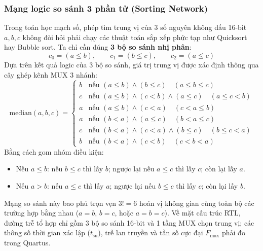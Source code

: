 \subsubsection*{Mạng logic so sánh 3 phần tử (Sorting Network)}
Trong toán học mạch số, phép tìm trung vị của 3 số nguyên không dấu 16-bit $a, b, c$ không đòi hỏi phải chạy các thuật toán sắp xếp phức tạp như Quicksort hay Bubble sort. Ta chỉ cần đúng \textbf{3 bộ so sánh nhị phân}:
\begin{equation}
    c_0 = (a \le b), \qquad c_1 = (b \le c), \qquad c_2 = (a \le c)
\end{equation}
Dựa trên kết quả logic của 3 bộ so sánh, giá trị trung vị được xác định thông qua cây ghép kênh MUX 3 nhánh:
\begin{equation}
    \text{median}(a, b, c) =
    \begin{cases}
        b & \text{nếu } (a \le b) \land (b \le c) \quad (a \le b \le c) \\
        c & \text{nếu } (a \le b) \land (c < b) \land (a \le c) \quad (a \le c < b) \\
        a & \text{nếu } (a \le b) \land (c < a) \quad (c < a \le b) \\
        a & \text{nếu } (b < a) \land (a \le c) \quad (b < a \le c) \\
        c & \text{nếu } (b < a) \land (c < a) \land (b \le c) \quad (b \le c < a) \\
        b & \text{nếu } (b < a) \land (c < b) \quad (c < b < a)
    \end{cases}
    \label{eq:median3_cases}
\end{equation}
Bằng cách gom nhóm điều kiện:
\begin{itemize}
    \item Nếu $a \le b$: nếu $b \le c$ thì lấy $b$; ngược lại nếu $a \le c$ thì lấy $c$; còn lại lấy $a$.
    \item Nếu $a > b$: nếu $a \le c$ thì lấy $a$; ngược lại nếu $b \le c$ thì lấy $c$; còn lại lấy $b$.
\end{itemize}
Mạng so sánh này bao phủ trọn vẹn $3! = 6$ hoán vị không gian cùng toàn bộ các trường hợp bằng nhau ($a = b$, $b = c$, hoặc $a = b = c$). Về mặt cấu trúc RTL, đường trễ tổ hợp chỉ gồm 3 bộ so sánh 16-bit và 1 tầng MUX chọn trung vị; các thông số thời gian xác lập ($t_{\text{su}}$), trễ lan truyền và tần số cực đại $F_{\max}$ phải đo trong Quartus.

